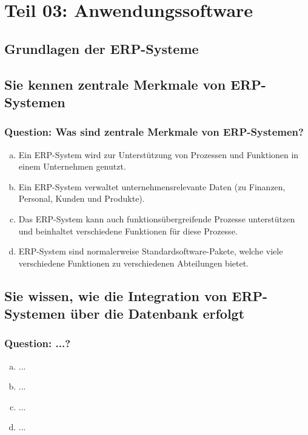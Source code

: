\documentclass{article}
\begin{document}
	\newpage
	\setcounter{section}{0}
	\section*{Teil 03: Anwendungssoftware}
	\begin{adjustwidth}{2em}{2em}
		\section{Grundlagen der ERP-Systeme}
		\begin{adjustwidth}{2em}{2em}
			\subsection{Sie kennen zentrale Merkmale von ERP-Systemen}
			\begin{adjustwidth}{1em}{}
				\subsubsection*{Question: Was sind zentrale Merkmale von ERP-Systemen?}
				\begin{adjustwidth}{1em}{}
					\begin{enumerate}[(a)]
						\item Ein ERP-System wird zur Unterstützung von Prozessen und Funktionen in einem Unternehmen genutzt.
						\item Ein ERP-System verwaltet unternehmensrelevante Daten (zu Finanzen, Personal, Kunden und Produkte).
						\item Das ERP-System kann auch funktionsübergreifende Prozesse unterstützen und beinhaltet verschiedene Funktionen für diese Prozesse.
						\item ERP-System sind normalerweise Standardsoftware-Pakete, welche viele verschiedene Funktionen zu verschiedenen Abteilungen bietet.
					\end{enumerate}
				\end{adjustwidth}
			\end{adjustwidth}
			\subsection{Sie wissen, wie die Integration von ERP-Systemen über die Datenbank erfolgt}
			\begin{adjustwidth}{1em}{}
				\subsubsection*{Question: ...?}
				\begin{adjustwidth}{1em}{}
					\begin{enumerate}[(a)]
						\item ...
						\item ...
						\item ...
						\item ...
					\end{enumerate}
				\end{adjustwidth}
			\end{adjustwidth}

\end{adjustwidth}
\end{adjustwidth}
\end{document}
